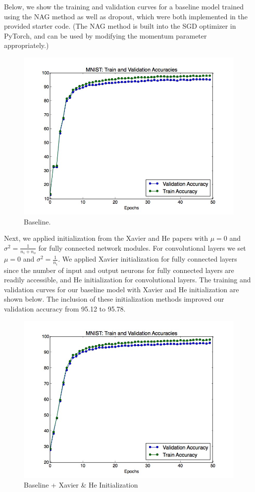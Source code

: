 \documentclass[a4paper]{article}
\begin{document}
\begin{enumerate}
{Below, we show the training and validation curves for a baseline model trained using the NAG method as well as dropout, which were both implemented in the provided starter code. (The NAG method is built into the SGD optimizer in PyTorch, and can be used by modifying the momentum parameter appropriately.)

\begin{figure}[H]
  \includegraphics[width=12cm]{../plots/accuracies_baseline.jpg}
  \centering
  \caption{Baseline.}
  \label{fig:boat1}
\end{figure}

Next, we applied initialization from the Xavier and He papers with $\mu=0$ and $\sigma^2 = \frac{1}{n_i + n_o}$ for fully connected network modules. For convolutional layers we set $\mu=0$ and $\sigma^2 = \frac{1}{n_i}$. 
We applied Xavier initialization for fully connected layers since the number of input and output neurons for fully connected layers are readily accessible, and He initialization for convolutional layers. The training and validation curves for our baseline model with Xavier and He initialization are shown below. The inclusion of these initialization methods improved our validation accuracy from 95.12 to 95.78.

\begin{figure}[H]
  \includegraphics[width=12cm]{../plots/accuracies_xavier.jpg}
  \centering
  \caption{Baseline + Xavier \& He Initialization}
  \label{fig:boat1}
\end{figure}

}
\end{enumerate}
\end{document}
